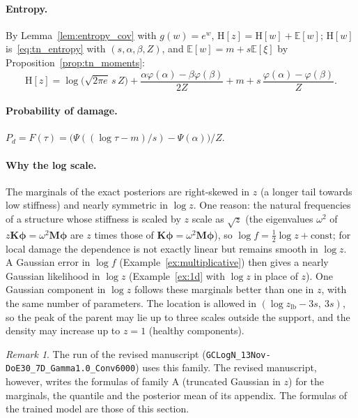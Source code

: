 \documentclass[11pt,a4paper]{article}
\numberwithin{equation}{section}
\theoremstyle{plain}
\theoremstyle{definition}
\theoremstyle{remark}
\newtheorem{remark}[proposition]{Remark}
\newcommand{\E}{\mathbb{E}}
\newcommand{\Hent}{\mathrm{H}}
\newcommand{\zlb}{z_{\text{lb}}}
\begin{document}
\paragraph{Entropy.} By Lemma~\ref{lem:entropy_cov} with $g(w)=e^w$, $\Hent[z]=\Hent[w]+\E[w]$; $\Hent[w]$ is~\eqref{eq:tn_entropy} with $(s,\alpha,\beta,Z)$, and $\E[w]=m+s\E[\xi]$ by Proposition~\ref{prop:tn_moments}:
\begin{equation}
\Hent[z]=\log\big(\sqrt{2\pi e}\,s\,Z\big)+\frac{\alpha\varphi(\alpha)-\beta\varphi(\beta)}{2Z}+m+s\,\frac{\varphi(\alpha)-\varphi(\beta)}{Z}.
\end{equation}

\paragraph{Probability of damage.} $P_d=F(\tau)=\big(\Psi((\log\tau-m)/s)-\Psi(\alpha)\big)/Z$.

\paragraph{Why the log scale.} The marginals of the exact posteriors are right-skewed in $z$ (a longer tail towards low stiffness) and nearly symmetric in $\log z$. One reason: the natural frequencies of a structure whose stiffness is scaled by $z$ scale as $\sqrt z$ (the eigenvalues $\omega^2$ of $z\mathbf K\bm\phi=\omega^2\mathbf M\bm\phi$ are $z$ times those of $\mathbf K\bm\phi=\omega^2\mathbf M\bm\phi$), so $\log f=\tfrac12\log z+\text{const}$; for local damage the dependence is not exactly linear but remains smooth in $\log z$. A Gaussian error in $\log f$ (Example~\ref{ex:multiplicative}) then gives a nearly Gaussian likelihood in $\log z$ (Example~\ref{ex:1d} with $\log z$ in place of $z$). One Gaussian component in $\log z$ follows these marginals better than one in $z$, with the same number of parameters. The location is allowed in $(\log\zlb-3s,\ 3s)$, so the peak of the parent may lie up to three scales outside the support, and the density may increase up to $z=1$ (healthy components).

\begin{remark}
The run of the revised manuscript (\texttt{GCLogN\_13Nov-DoE30\_7D\_}\allowbreak\texttt{Gamma1.0\_Conv6000}) uses this family. The revised manuscript, however, writes the formulas of family A (truncated Gaussian in $z$) for the marginals, the quantile and the posterior mean of its appendix. The formulas of the trained model are those of this section.
\end{remark}
\end{document}
